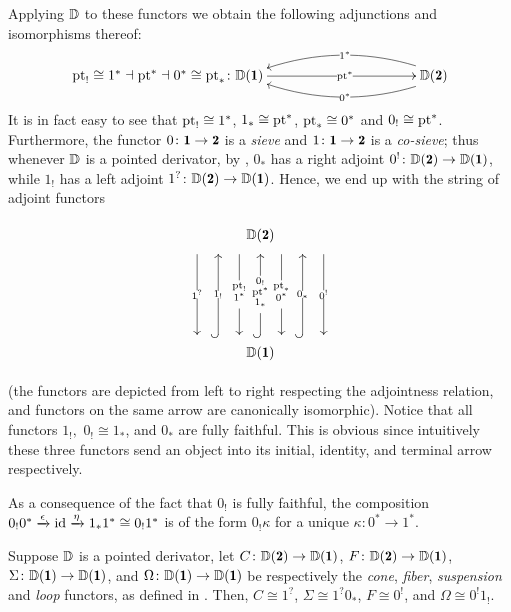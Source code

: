 Applying $\mathbb{D}$ to these functors we obtain the following adjunctions and isomorphisms thereof:
\[
\xymatrix@C=1.5cm{
**[l] \pt_! \cong 1^* \dashv \pt^* \dashv 0^* \cong \pt_* \colon
\D(\uno)\ar[r]|{\pt^*}&\ar@/_-1pc/@<3pt>[l]|{0^*}\ar@/_1pc/@<-3pt>[l]|{1^*} {\D(\due)}
}
\]
It is in fact easy to see that $\text{pt}_!\cong 1^*$, $1_*\cong \text{pt}^*$, $\text{pt}_*\cong 0^*$ and $0_!\cong \text{pt}^*$. Furthermore, the functor $0\colon \uno \to \due$ is a \emph{sieve} and $1\colon \uno\to \due$ is a \emph{co-sieve}; thus whenever $\mathbb{D}$ is a pointed derivator, by \cite[Corollary \textbf{3.8}]{Moritz}, $0_*$ has a right adjoint $0^!\colon \D(\due)\to \D(\uno)$, while $1_!$ has a left adjoint $1^?\colon \D(\due)\to \D(\uno)$. Hence, we end up with the string of adjoint functors
\[
\xymatrix@M=3mm@R=2cm{
     \ar@<4.5em>[d]|{0^!}
    \ar@<-4.5em>[d]|{1^?}
	\D(\due)
	\ar@<-1.5em>[d]|{\begin{smallmatrix} {}\\ \pt_!\\ 1^* \\{}\end{smallmatrix}}
	 \ar@<1.5em>[d]|{\begin{smallmatrix} {}\\ \pt_* \\ 0^* \\{}\end{smallmatrix}}\\
	\ar@{^{(}->}[u]|{\begin{smallmatrix} {}\\ 0_! \\ \pt^*  \\ 1_*\\{}\end{smallmatrix}}
	\D(\uno)
	 \ar@{^{(}->}@<3em>[u]|{1_!}
	\ar@{^{(}->}@<-3em>[u]|{0_*}
}
\]
(the functors are depicted from left to right respecting the adjointness relation, and functors on the same arrow are canonically isomorphic). Notice that all functors $1_!,$ $0_!\cong 1_*$, and $0_*$ are fully faithful. This is obvious since intuitively these three functors send an object into its initial, identity, and terminal arrow respectively.
\begin{notat}\label{la-kappa}
As a consequence of the fact that $0_!$ is fully faithful, the composition $0_!0^* \xrightarrow{\epsilon} \operatorname{id} \xrightarrow{\eta} 1_*1^*\cong 0_!1^*$ is of the form $0_!\kappa$ for a unique $\kappa\colon 0^* \to 1^*$.
\end{notat}
\begin{lemma}
Suppose $\mathbb{D}$ is a pointed derivator, let $C\colon \D(\due)\to \D(\uno)$, $F\colon \D(\due)\to \D(\uno)$, $\Sigma\colon \D(\uno)\to \D(\uno)$, and $\Omega\colon \D(\uno)\to \D(\uno)$ be respectively the \emph{cone}, \emph{fiber}, \emph{suspension} and \emph{loop} functors, as defined in \cite[§\textbf{3.3}]{Moritz}. Then, $C\cong 1^?$, $\Sigma\cong 1^?0_*$, $F\cong 0^!$, and $\Omega\cong 0^!1_!$.
\end{lemma}
